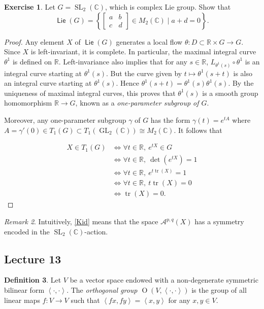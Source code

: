 \documentclass[10pt,letterpaper,cm]{nupset}
\theoremstyle{definition}
\newtheorem{defn}{Definition}[subsection]
\theoremstyle{theorem}
\newtheorem{exercise}[defn]{Exercise}
\theoremstyle{remark}
\newtheorem{remark}[defn]{Remark}
\newcommand{\A}{\mathcal A}
\newcommand{\C}{\mathbb C}
\newcommand{\R}{\mathbb{R}}
\newcommand{\1}{\mathbb{1}}
\newcommand{\0}{\vec 0}
\DeclareMathOperator{\tr}{tr}
\DeclareMathOperator{\GL}{GL}
\DeclareMathOperator{\SL}{SL}
\DeclareMathOperator{\Or}{O}
\DeclareMathOperator{\lie}{\mathsf{Lie}}
\begin{document}
\begin{exercise}
Let $G= \SL_2\left(\C\right)$, which is complex Lie group. Show that $$\lie(G) = \left\{\begin{bmatrix} a & b \\ c & d \end{bmatrix} \in M_2\left(\C\right) \mid a+d =0\right\}.$$
\end{exercise}
\begin{proof}
Any element $X$ of $\lie(G)$ generates a local flow $\theta : D \subset \R \times G \to G$. Since $X$ is left-invariant, it is complete. In particular, the maximal integral curve $\theta^1$ is defined on $\R$.  Left-invariance also implies that for any $s\in \R$, $L_{\theta^1(s)} \circ \theta^1$ is an integral curve starting at $\theta^1(s)$. But the curve given by $t\mapsto \theta^1(s+t)$ is also an integral curve starting at $\theta^1(s)$. Hence $ \theta^1(s+t) = \theta^1(s)\theta^1(s)$. By the uniqueness of maximal integral curves, this proves that $\theta^1(s)$ is a smooth group homomorphism $\R \to G$, known as a \textit{one-parameter subgroup of $G$}. 

\smallskip

Moreover, any one-parameter subgroup $\gamma$ of $G$ has the form  $\gamma(t) = e^{tA}$ where $A = \gamma'(0) \in T_1(G) \subset T_1\left(\GL_2(\C)\right) \cong M_2(\C)$. It follows that 

\begin{align*}
X \in T_1(G)&  \iff \forall{t} \in \R, \  e^{tX} \in G 
\\ & \iff  \forall{t} \in \R, \  \det\left(e^{tX}\right) =1
\\ & \iff  \forall{t} \in \R, \ e^{t\tr(X)} =1
\\ & \iff \forall{t} \in \R, \ t\tr(X) = 0
\\ & \iff \tr(X) =0
. \end{align*}
\end{proof}

\begin{remark}
Intuitively, \cref{Kid} means that the space $\A^{p,q}\left(X\right)$ has a symmetry encoded in the $\SL_2\left(\C\right)$-action.  
\end{remark}

\subsection{Lecture 13}

\begin{defn}
Let $V$ be a vector space endowed with a non-degenerate symmetric bilinear form $\left\langle \cdot , \cdot \right\rangle$. The \textit{orthogonal group $\Or\left(V, \left\langle \cdot , \cdot \right\rangle\right)$} is the group of all linear maps $f : V \to V$ such that $\left\langle f{x}, f{y}\right\rangle = \left\langle x,y\right\rangle$ for any $x,y\in V$.
\end{defn}
\end{document}
